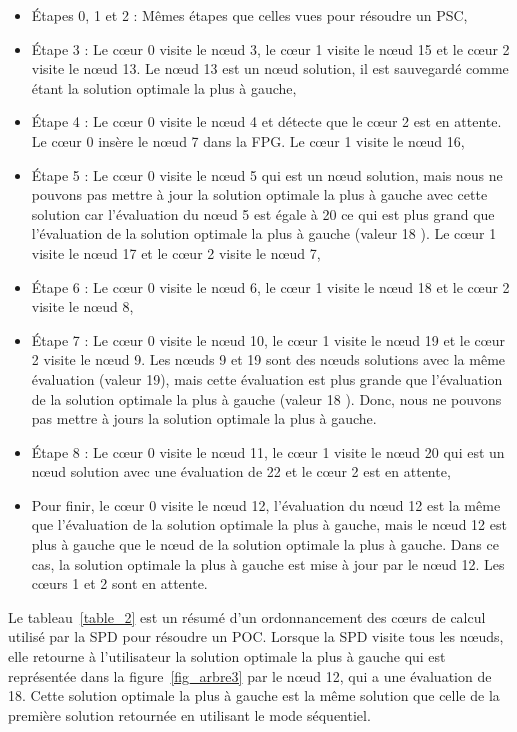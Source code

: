 \documentclass[parallelisme]{compas2014}
\begin{document}
\begin{itemize}
\item Étapes 0, 1 et 2 : Mêmes étapes que celles vues pour résoudre un PSC,
\item Étape 3 : Le cœur 0 visite le nœud 3, le cœur 1 visite le nœud 15 et le cœur 2 visite le nœud 13. Le nœud 13 est un nœud solution, il est sauvegardé comme étant la solution optimale la plus à gauche,
\item Étape 4 : Le cœur 0 visite le nœud 4 et détecte que le cœur 2 est en attente. Le cœur 0 insère le nœud 7 dans la FPG. Le cœur 1 visite le nœud 16,
\item Étape 5 : Le cœur 0 visite le nœud 5 qui est un nœud solution, mais nous ne pouvons pas mettre à jour la solution optimale la plus à gauche avec cette solution car l'évaluation du nœud 5 est égale à 20 ce qui est plus grand que l'évaluation de la solution optimale la plus à gauche (valeur 18 ). Le cœur 1 visite le nœud 17 et le cœur 2 visite le nœud 7,
\item Étape 6 : Le cœur 0 visite le nœud 6, le cœur 1 visite le nœud 18 et le cœur 2 visite le nœud 8,
\item Étape 7 : Le cœur 0 visite le nœud 10, le cœur 1 visite le nœud 19 et le cœur 2 visite le nœud 9. Les nœuds 9 et 19 sont des nœuds solutions avec la même évaluation (valeur 19), mais cette évaluation est plus grande que l'évaluation de la solution optimale la plus à gauche (valeur 18 ). Donc, nous ne pouvons pas mettre à jours la solution optimale la plus à gauche.
\item Étape 8 : Le cœur 0 visite le nœud 11, le cœur 1 visite le nœud 20 qui est un nœud solution avec une évaluation de 22 et le cœur 2 est en attente,
\item Pour finir, le cœur 0 visite le nœud 12, l'évaluation du nœud 12 est la même que l'évaluation de la solution optimale la plus à gauche, mais le nœud 12 est plus à gauche que le nœud de la solution optimale la plus à gauche. Dans ce cas, la solution optimale la plus à gauche est mise à jour par le nœud 12. Les cœurs 1 et 2 sont en attente.
\end{itemize}

Le tableau~\ref{table_2} est un résumé d'un ordonnancement des cœurs de calcul utilisé par la SPD pour résoudre un POC. Lorsque la SPD visite tous les nœuds, elle retourne à l'utilisateur la solution optimale la plus à gauche qui est représentée dans la figure~\ref{fig_arbre3} par le nœud 12, qui a une évaluation de 18. Cette solution optimale la plus à gauche est la même solution que celle de la première solution retournée en utilisant le mode séquentiel.
\end{document}
